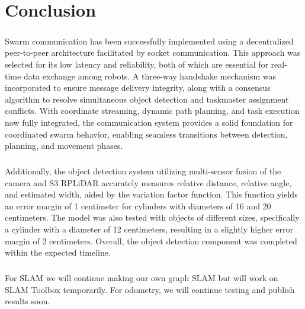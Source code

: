 \chapter{Conclusion}

\paragraph*{}
Swarm communication has been successfully implemented using a decentralized peer-to-peer architecture facilitated by socket communication. This approach was selected for its low latency and reliability, both of which are essential for real-time data exchange among robots. A three-way handshake mechanism was incorporated to ensure message delivery integrity, along with a consensus algorithm to resolve simultaneous object detection and taskmaster assignment conflicts. With coordinate streaming, dynamic path planning, and task execution now fully integrated, the communication system provides a solid foundation for coordinated swarm behavior, enabling seamless transitions between detection, planning, and movement phases.

\paragraph*{}
Additionally, the object detection system utilizing multi-sensor fusion of the camera and S3 RPLiDAR accurately measures relative distance, relative angle, and estimated width, aided by the variation factor function. This function yields an error margin of 1 centimeter for cylinders with diameters of 16 and 20 centimeters. The model was also tested with objects of different sizes, specifically a cylinder with a diameter of 12 centimeters, resulting in a slightly higher error margin of 2 centimeters. Overall, the object detection component was completed within the expected timeline.

\paragraph*{}
For SLAM we will continue making our own graph SLAM but will work on SLAM Toolbox temporarily. For odometry, we will continue testing and publish results soon.

